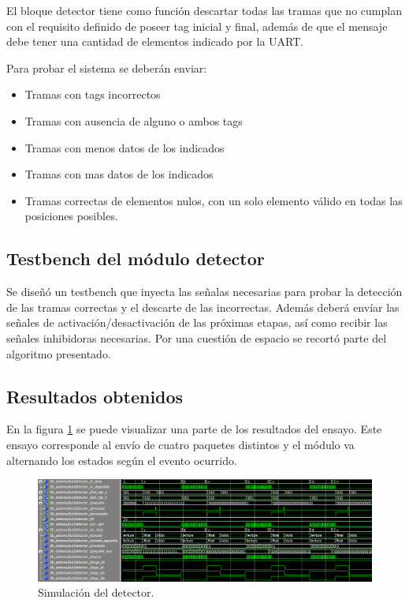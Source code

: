 	El bloque detector tiene como función descartar todas las tramas que no cumplan con el requisito definido de poseer tag inicial y final, además de que el mensaje debe tener una cantidad de elementos indicado por la UART.
	
	Para probar el sistema se deberán enviar:
	
	\begin{itemize}
		\item Tramas con tags incorrectos
		\item Tramas con ausencia de alguno o ambos tags
		\item Tramas con menos datos de los indicados
		\item Tramas con mas datos de los indicados
		\item Tramas correctas de elementos nulos, con un solo elemento válido en todas las posiciones posibles.
	\end{itemize}
	
	\subsection{Testbench del módulo detector}
			
		Se diseñó un testbench que inyecta las señalas necesarias para probar la detección de las tramas correctas y el descarte de las incorrectas. Además deberá envíar las señales de activación/desactivación de las próximas etapas, así como recibir las señales inhibidoras necesarias. Por una cuestión de espacio se recortó parte del algoritmo presentado.		
						
	\subsection{Resultados obtenidos}
				
		En la figura \ref{fig:Test_Detector} se puede visualizar una parte de los resultados del ensayo. Este ensayo corresponde al envío de cuatro paquetes distintos y el módulo va alternando los estados según el evento ocurrido. 
		
		\begin{figure}[h]
		\centering
		\includegraphics[scale=0.5]{./Figures/Test/Detector}
			\caption{Simulación del detector.}
			\label{fig:Test_Detector}
		\end{figure}

